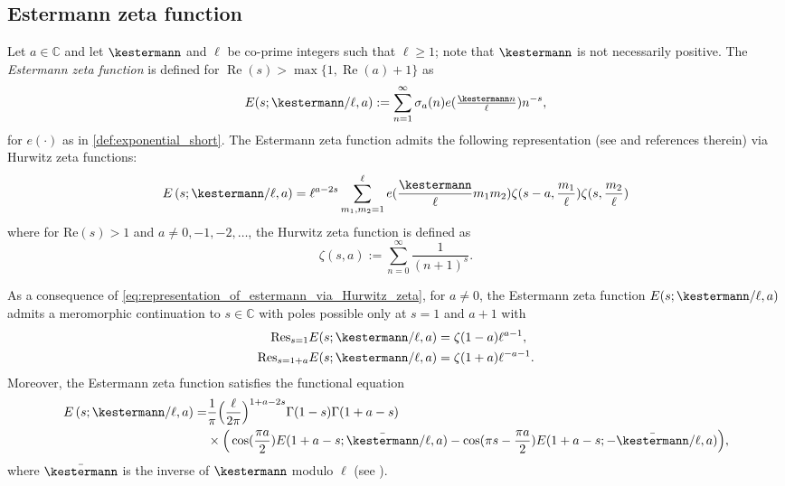\documentclass[]{article}
\renewcommand{\Re}{\operatorname{Re}}
\begin{document}
\subsection{Estermann zeta function}
Let $a \in \mathbb{C}$ and let $\kestermann$ and $\ell$ be co-prime integers such that $\ell \ge 1$; note that $\kestermann$ is not necessarily positive. The \textit{Estermann zeta function} is defined for $\Re(s) > \max \{ 1, \Re(a) + 1 \}$ as
	\begin{equation}\label{def:estermann}
		E(s; \kestermann/\ell, a) := \sum_{n=1}^\infty \sigma_{a}(n) e( \tfrac{\kestermann n}{\ell}) n^{-s},
	\end{equation}
    for $e(\cdot)$ as in \eqref{def:exponential_short}.   The Estermann zeta function admits the following representation (see \cite{ishibashi1995} and references therein) via Hurwitz zeta functions:
\begin{equation}\label{eq:representation_of_estermann_via_Hurwitz_zeta}
     \begin{split}
         E\left(s; \kestermann/\ell, a\right)=\ell^{a-2 s} \sum_{m_1, m_2=1}^\ell e(\frac{ \kestermann}{\ell} m_1 m_2 ) \zeta(s-a, \frac{m_1}{\ell}) \zeta(s, \frac{m_2}{\ell})
     \end{split}
 \end{equation} 
 where for $\text{Re}(s)>1$ and $a\neq 0, -1, -2,\dots$, the Hurwitz zeta function is defined as  \begin{equation}\zeta(s,a):= \sum_{n=0}^\infty\frac{1}{(n+1)^s}.\end{equation} 
 
As a consequence of \eqref{eq:representation_of_estermann_via_Hurwitz_zeta}, for $a \neq 0$, the Estermann zeta function $E(s; \kestermann/\ell, a)$ admits a meromorphic continuation to $s \in \mathbb{C}$ with poles possible only at $s=1$ and $a + 1$ with 
\begin{equation}\label{eq:estermann_zero}
     \begin{split}
         \text{Res}_{s=1} E(s ; \kestermann / \ell, a )  &= \zeta(1-a) \ell^{a-1}, \\
         \text{Res}_{s=1+a} E(s ; \kestermann / \ell, a )  &= \zeta(1+a) \ell^{-a-1}.
     \end{split}
\end{equation}
Moreover, the Estermann zeta function satisfies the functional equation
\begin{equation}\label{eq:functional_equation_estermann_zeta}
    \begin{split}
E\left(s ; \kestermann / \ell, a \right)= & \frac{1}{\pi}\Big(\frac{\ell}{2 \pi}\Big)^{1+a-2 s} \Gamma(1-s) \Gamma(1+a-s) \\
& \times \Big(\cos(\frac{\pi a}{2}) E(1+a-s ; \bar{\kestermann} / \ell, a)-\cos (\pi s-\frac{\pi a}{2}) E(1+a-s ;-\bar{\kestermann} / \ell, a) \Big), 
    \end{split}
\end{equation}
where $\bar{\kestermann}$ is the inverse of $\kestermann$ modulo $\ell$ (see \cite[(2.4)]{kiuchi1987exponential}).
\end{document}
